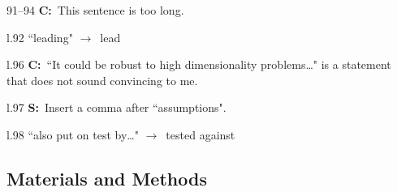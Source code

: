 \documentclass[11pt]{article}
\newenvironment{my_description}
{\begin{description}
  \setlength{\itemsep}{2pt}
  \setlength{\parskip}{0pt}
  \setlength{\parsep}{0pt}}
{\end{description}}
\newcommand{\ra}{$\rightarrow$\ }
\newcommand{\C}{\textbf{C:}\ }
\newcommand{\V}{\textbf{S:}\ }
\begin{document}
\begin{my_description}
	\item[91--94] \C This sentence is too long.
	\item[l.92] ``leading" \ra lead
	\item[l.96] \C ``It could be robust to high dimensionality problems\dots" is a statement that does not sound convincing to me.
	\item[l.97] \V Insert a comma after ``assumptions".
	\item[l.98] ``also put on test by\dots" \ra tested against
\end{my_description}



\subsection{Materials and Methods}
\end{document}
